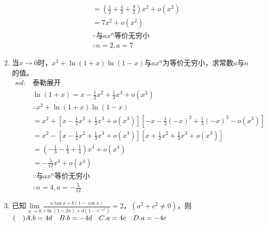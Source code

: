 \begin{enumerate}[{例}1.]
\begin{align*}
                &=(\frac{1}{2}+\frac{4}{2}+\frac{9}{2})x^2+o(x^2)\\
                &=7x^2+o(x^2)\\
                &\because\mbox{与}ax^n\mbox{等价无穷小}\\
                &\therefore n=2,a=7
        \end{align*}
    \item 当$x\to0$时，$x^2+\ln(1+x)\ln(1-x)$与$ax^n$为等价无穷小，求常数$a$与$n$的值。
        \begin{align*}
            sol:&\mbox{泰勒展开}\\
                &\ln (1+x)=x-\frac{1}{2}x^2+\frac{1}{3}x^3+o(x^3)\\
                &\therefore x^2+\ln(1+x)\ln(1-x)\\
                &=x^2+[x-\frac{1}{2}x^2+\frac{1}{3}x^3+o(x^3)][-x-\frac{1}{2}(-x)^2+\frac{1}{3}(-x)^3-o(x^3)]\\
                &=x^2-[x-\frac{1}{2}x^2+\frac{1}{3}x^3+o(x^3)][x+\frac{1}{2}x^2+\frac{1}{3}x^3+o(x^3)]\\
                &=(-\frac{1}{3}-\frac{1}{3}+\frac{1}{4})x^4+o(x^4)\\
                &=-\frac{5}{12}x^4+o(x^4)\\
                &\because\mbox{与}ax^n\mbox{等价无穷小}\\
                &\therefore n=4,a=-\frac{5}{12}
        \end{align*}
    \item 已知$\lim\limits_{x\to0}\frac{a\tan x+b(1-\cos x)}{c\ln(1-2x)+d(1-e^{-x^2})}=2$，$(a^2+c^2\neq0)$，则$(\quad)\\ A.b=4d\quad B.b=-4d\quad C.a=4c\quad D.a=-4c$


\end{enumerate}
